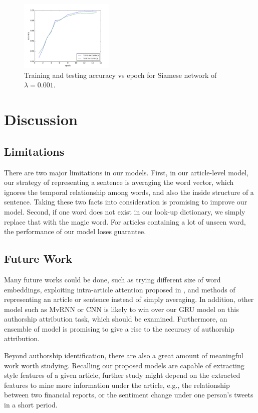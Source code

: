 \documentclass{article} %
\begin{document}
\begin{figure}[H]
\centering
\includegraphics[width=0.4\textwidth]{figures/accu_siamese.png} 
\caption{Training and testing accuracy vs epoch for Siamese network of $\lambda=0.001$.}
\label{siamese_accu}
\end{figure}



\section{Discussion}
\subsection{Limitations}

There are two major limitations in our models. First, in our article-level model, our strategy of representing a sentence is averaging the word vector, which ignores the temporal relationship among words, and also the inside structure of a sentence. Taking these two facts into consideration is promising to improve our model. Second, if one word does not exist in our look-up dictionary, we simply replace that with the magic word. For articles containing a lot of unseen word, the performance of our model loses guarantee.


\subsection{Future Work}
Many future works could be done, such as trying different size of word embeddings, exploiting intra-article attention proposed in \cite{intra}, and methods of representing an article or sentence instead of simply averaging. In addition, other model such as MvRNN or CNN is likely to win over our GRU model on this authorship attribution task, which should be examined. Furthermore, an ensemble of model is promising to give a rise to the accuracy of authorship attribution.

Beyond authorship identification, there are also a great amount of meaningful work worth studying. Recalling our proposed models are capable of extracting style features of a given article, further study might depend on the extracted features to mine more information under the article, e.g., the relationship between two financial reports, or the sentiment change under one person's tweets in a short period.  
\end{document}
